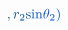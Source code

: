 \documentclass[12pt]{article}
\begin{document}
\begin{displaymath}
\mathcolor[RGB]{0,75,120}{,} \mathcolor[RGB]{0,75,135}{r} _ { \mathcolor[RGB]{0,75,150}{2} } \mathrm { \mathcolor[RGB]{0,75,165}{s} \mathcolor[RGB]{0,75,180}{i} \mathcolor[RGB]{0,75,195}{n} } \mathcolor[RGB]{0,75,210}{\theta} _ { \mathcolor[RGB]{0,75,225}{2} } \mathcolor[RGB]{0,75,240}{)}
\end{displaymath}
\end{document}
